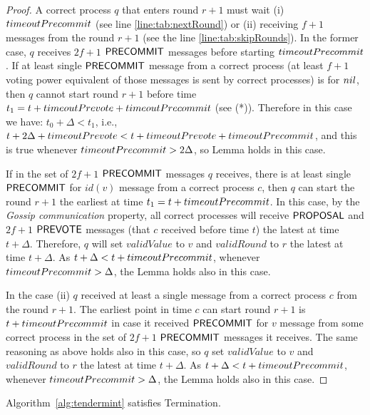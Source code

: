 \begin{proof}
A correct process $q$ that enters round $r+1$ must wait (i) $timeoutPrecommit$ (see line \ref{line:tab:nextRound}) or (ii) receiving $f+1$ messages from the round $r+1$ (see the line \ref{line:tab:skipRounds}). 
In the former case, $q$ receives $2f+1$ $\mathsf{PRECOMMIT}$ messages before starting $timeoutPrecommit$. If at least single $\mathsf{PRECOMMIT}$ message from a correct process (at least $f+1$ voting power equivalent of those messages is sent by correct processes) is for $nil$, then $q$ cannot start round $r+1$ before time $t_1 = t + timeoutPrevote + timeoutPrecommit$ (see (*)). Therefore in this case we have: $t_0 + \Delta < t_1$, i.e., 
$t+2\Delta+timeoutPrevote <  t + timeoutPrevote + timeoutPrecommit$, and this is true whenever $timeoutPrecommit > 2\Delta$, so Lemma holds in this case. 

If in the set of $2f+1$ $\mathsf{PRECOMMIT}$ messages $q$ receives, there is at least single $\mathsf{PRECOMMIT}$ for $id(v)$ message from a correct process $c$, 
then $q$ can start the round $r+1$ the earliest at time $t_1 = t+timeoutPrecommit$. In this case,
by the \emph{Gossip communication} property, all correct processes will receive $\mathsf{PROPOSAL}$ and $2f+1$ $\mathsf{PREVOTE}$ messages (that $c$ received before time $t$) the latest at time $t+\Delta$. Therefore, $q$ will set $validValue$ to $v$ and $validRound$ to $r$ the latest at time $t+\Delta$. As $t+\Delta < t+timeoutPrecommit$, whenever $timeoutPrecommit > \Delta$, the Lemma holds also in this case.    

In the case (ii) $q$ received at least a single message from a correct process $c$ from the round
$r+1$. The earliest point in time $c$ can start round $r+1$ is $t+timeoutPrecommit$ in case it received $\mathsf{PRECOMMIT}$ for $v$ message from some correct process in the set of $2f+1$ $\mathsf{PRECOMMIT}$ messages it receives. The same reasoning as above holds also in this case, so $q$ set $validValue$ to $v$ and $validRound$ to $r$ the latest at time $t+\Delta$. As $t+\Delta < t+timeoutPrecommit$, whenever $timeoutPrecommit > \Delta$, the Lemma holds also in this case.    
\end{proof}

\begin{lemma}
	\label{lemma:agreement}
Algorithm~\ref{alg:tendermint} satisfies Termination. 
\end{lemma}

